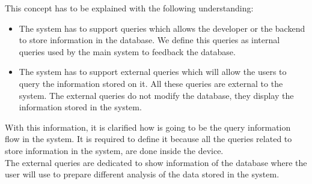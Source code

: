 This concept has to be explained with the following understanding:

\begin{itemize}
\item The system has to support queries which allows the developer or the backend to store information in the database. We define this queries as internal queries used by the main system to feedback the database.
\item The system has to support external queries which will allow the users to query the information stored on it. All these queries are external to the system. The external queries do not modify the database, they display the information stored in the system.
\end{itemize}

With this information, it is clarified how is going to be the query information flow in the system. It is required to define it because all the queries related to store information in the system, are done inside the device.\\

The external queries are dedicated to show information of the database where the user will use to prepare different analysis of the data stored in the system.

\newpage
\newpage

